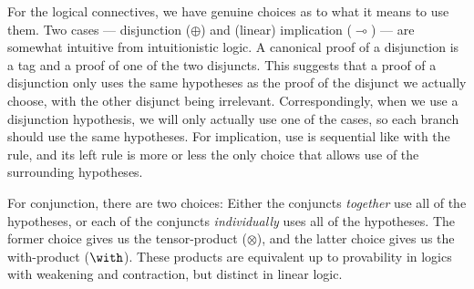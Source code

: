 For the logical connectives, we have genuine choices as to what it means to use
them.
Two cases --- disjunction ($\oplus$) and (linear) implication ($\multimap$) ---
are somewhat intuitive from intuitionistic logic.
A canonical proof of a disjunction is a tag and a proof of one of the two
disjuncts.
This suggests that a proof of a disjunction only uses the same hypotheses as
the proof of the disjunct we actually choose, with the other disjunct being
irrelevant.
Correspondingly, when we use a disjunction hypothesis, we will only actually use
one of the cases, so each branch should use the same hypotheses.
For implication, use is sequential like with the  rule, and its
left rule is more or less the only choice that allows use of the surrounding
hypotheses.

For conjunction, there are two choices: Either the conjuncts \emph{together} use
all of the hypotheses, or each of the conjuncts \emph{individually} uses all of
the hypotheses.
The former choice gives us the tensor-product ($\otimes$), and the latter choice
gives us the with-product ($\with$).
These products are equivalent up to provability in logics with weakening and
contraction, but distinct in linear logic.

